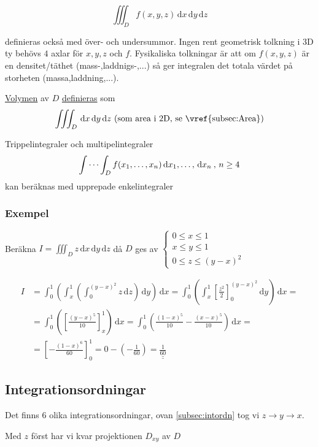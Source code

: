 \documentclass[a4paper]{article}
\newcommand{\svar}[1]{\underline{\underline{#1}}}
\begin{document}
$$\iiint_D f(x,y,z) \,\mathrm{d}x\,\mathrm{d}y\,\mathrm{d}z$$

definieras också med över- och undersummor. Ingen rent geometrisk tolkning i 3D ty behövs $4$ axlar för $x,y,z$ och $f$.
Fysikaliska tolkningar är att om $f(x,y,z)$ är en densitet/täthet (mass-,laddnigs-,...) så ger integralen det totala värdet på storheten (massa,laddning,...). \newline

\underline{Volymen} av $D$ \underline{definieras} som
$$\iiint_D \,\mathrm{d}x\,\mathrm{d}y\,\mathrm{d}z \text{  (som area i 2D, se \vref{subsec:Area})}$$

Trippelintegraler och multipelintegraler
$$\idotsint_D f(x_1,\ldots,x_n) \,\mathrm{d}x_1,\ldots,\,\mathrm{d}x_n \: ,\, n \geq 4$$
kan beräknas med upprepade enkelintegraler

\subsubsection{Exempel} \label{subsec:intordn}

Beräkna $I = \iiint_D z \,\mathrm{d}x\,\mathrm{d}y\,\mathrm{d}z$ då $D$ ges av
$\begin{cases}
	0 \leq x \leq 1 \\
	x \leq y \leq 1 \\
	0 \leq z \leq (y-x)^2
\end{cases}$

\begin{align*}
	I &= \int_0^1 \left(\int_x^1 \left( \int_0^{(y-x)^2} z\,\mathrm{d}z\right)\,\mathrm{d}y\right)\,\mathrm{d}x =
	\int_0^1 \left(\int_x^1 \left[ \frac{z^2}{2} \right]_0^{(y-x)^2}\,\mathrm{d}y\right)\,\mathrm{d}x = \\
	&= \int_0^1 \left(\left[\frac{(y-x)^5}{10}\right]_x^1\right)\,\mathrm{d}x =
	\int_0^1 \left(\frac{(1-x)^5}{10} - \frac{(x-x)^5}{10}\right)\,\mathrm{d}x = \\
	&= \left[-\frac{(1-x)^6}{60}\right]_0^1 =
	0 - \left(-\frac{1}{60}\right) =
	\svar{\frac{1}{60}}
\end{align*}

\newpage
\subsection{Integrationsordningar}
Det finns $6$ olika integrationsordningar, ovan \vref{subsec:intordn} tog vi $z\rightarrow y\rightarrow x$.

Med $z$ först har vi kvar projektionen $D_{xy}$ av $D$
\end{document}
